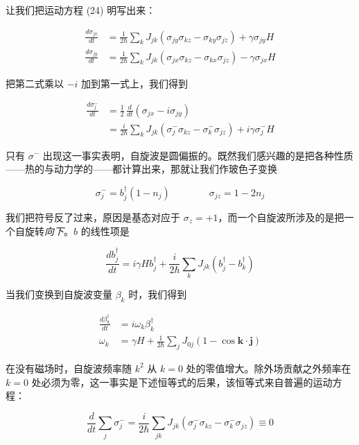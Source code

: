 让我们把运动方程 (24) 明写出来：

\begin{align*}
\frac{d\sigma_{jx}}{dt} &= \frac{1}{2\hbar}\sum_{k} J_{jk}\left(\sigma_{jy}\sigma_{kz} - \sigma_{ky}\sigma_{jz}\right) + \gamma\sigma_{jy}H \\
\frac{d\sigma_{jy}}{dt} &= \frac{1}{2\hbar}\sum_{k} J_{jk}\left(\sigma_{jx}\sigma_{kz} - \sigma_{kx}\sigma_{jz}\right) - \gamma\sigma_{jx}H
\end{align*}

把第二式乘以 $-i$ 加到第一式上，我们得到

\begin{align*}
\frac{d\sigma^{-}_{j}}{dt} &= \frac{1}{2}\,\frac{d}{dt}\left(\sigma_{jx} - i\sigma_{jy}\right) \\
&= \frac{i}{2\hbar}\sum_{k} J_{jk}\left(\sigma^{-}_{j}\sigma_{kz} - \sigma^{-}_{k}\sigma_{jz}\right) + i\gamma\sigma^{-}_{j}H
\end{align*}

只有 $\sigma^{-}$ 出现这一事实表明，自旋波是圆偏振的。既然我们感兴趣的是把各种性质——热的与动力学的——都计算出来，那就让我们作玻色子变换

\begin{equation*}
\sigma^{-}_{j} = b^{\dagger}_{j}\left(1-n_{j}\right) \qquad\qquad \sigma_{jz} = 1 - 2n_{j}
\end{equation*}

我们把符号反了过来，原因是基态对应于 $\sigma_{z} = +1$，而一个自旋波所涉及的是把一个自旋转\emph{向下}。$b$ 的线性项是

\begin{equation*}
\frac{db^{\dagger}_{j}}{dt} = i\gamma H b^{\dagger}_{j} + \frac{i}{2\hbar}\sum_{k} J_{jk}\left(b^{\dagger}_{j} - b^{\dagger}_{k}\right)
\end{equation*}

当我们变换到自旋波变量 $\beta_{k}$ 时，我们得到

\begin{align*}
\frac{d\beta^{\dagger}_{k}}{dt} &= i\omega_{k}\beta^{\dagger}_{k} \\
\omega_{k} &= \gamma H + \frac{1}{2\hbar}\sum_{j} J_{0j}\left(1 - \cos\mathbf{k}\cdot\mathbf{j}\right) \tag{25}
\end{align*}

在没有磁场时，自旋波频率随 $k^{2}$ 从 $k=0$ 处的零值增大。除外场贡献之外频率在 $k=0$ 处必须为零，这一事实是下述恒等式的后果，该恒等式来自普遍的运动方程：

\begin{equation*}
\frac{d}{dt}\sum_{j}\sigma^{-}_{j} = \frac{i}{2\hbar}\sum_{jk} J_{jk}\left(\sigma^{-}_{j}\sigma_{kz} - \sigma^{-}_{k}\sigma_{jz}\right) \equiv 0
\end{equation*}

